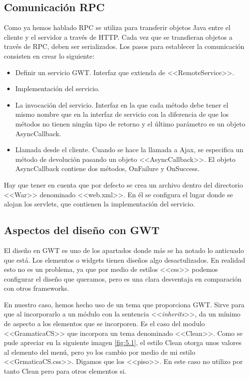 \subsection{Comunicación RPC}

Como ya hemos hablado RPC se utiliza para transferir objetos Java entre el cliente y el servidor a través de HTTP. Cada vez que se transfieran objetos a través de RPC, deben ser serializados. Los pasos para establecer la comunicación consisten en crear lo siguiente:

\begin{itemize}
\item Definir un servicio GWT. Interfaz que extienda de <<RemoteService>>. 
\item Implementación del servicio.
\item La invocación del servicio. Interfaz en la que cada método debe tener el mismo nombre que en la interfaz de servicio con la diferencia de que los métodos no tienen ningún tipo de retorno y el último parámetro es un objeto AsyncCallback.
\item Llamada desde el cliente. Cuando se hace la llamada a Ajax, se especifica un método de devolución pasando un objeto <<AsyncCallback>>. El objeto AsyncCallback contiene dos métodos, OnFailure y OnSuccess.
\end{itemize}

Hay que tener en cuenta que por defecto se crea un archivo dentro del directorio <<War>> denominado <<web.xml>>. En él se configura el lugar donde se alojan los servlets, que contienen la implementación del servicio.


\subsection{Aspectos del diseño con GWT}

El diseño en GWT es uno de los apartados donde más se ha notado lo anticuado que está. Los elementos o widgets tienen diseños algo desactulizados. En realidad esto no es un problema, ya que por medio de estilos <<css>> podemos configurar el diseño que queramos, pero es una clara desventaja en comparación con otros frameworks.

En nuestro caso, hemos hecho uso de un tema que proporciona GWT. Sirve para que al incorporarlo a un módulo con la sentencia <<\textit{inherits}>>, da un mínimo de aspecto a los elementos que se incorporen. Es el caso del modulo <<GramaticaCS>> que incorpora un tema denominado <<Clean>>. Como se pude apreciar en la siguiente imagen \ref{fig:5.1}, el estilo Clean otorga unos valores al elemento del menú, pero yo los cambio por medio de mi estilo <<GrmaticaCS.css>>. Digamos que los <<piso>>. En este caso no utilizo por tanto Clean pero para otros elementos si.

